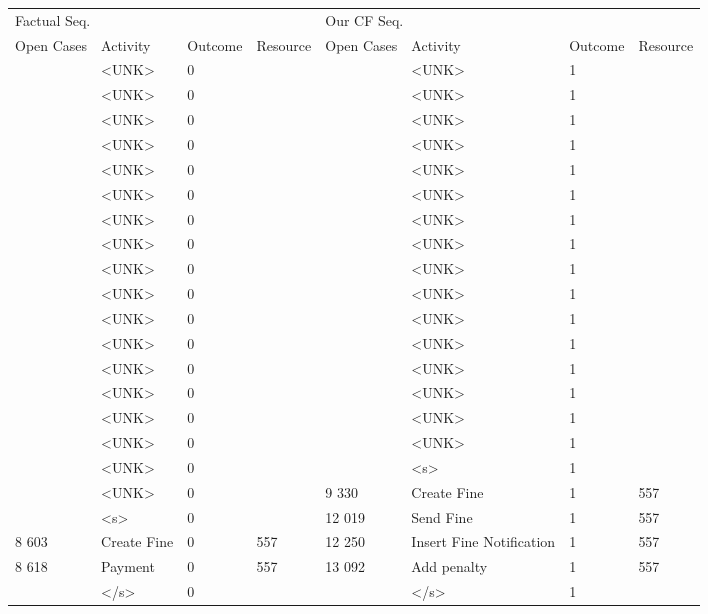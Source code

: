 \begin{tabular}{llllllll}
\toprule
\multicolumn{4}{l}{Factual Seq.} & \multicolumn{4}{l}{Our CF Seq.} \\
Open Cases & Activity & Outcome & Resource & Open Cases & Activity & Outcome & Resource \\
\midrule
 & <UNK> & 0 &  &  & <UNK> & 1 &  \\
 & <UNK> & 0 &  &  & <UNK> & 1 &  \\
 & <UNK> & 0 &  &  & <UNK> & 1 &  \\
 & <UNK> & 0 &  &  & <UNK> & 1 &  \\
 & <UNK> & 0 &  &  & <UNK> & 1 &  \\
 & <UNK> & 0 &  &  & <UNK> & 1 &  \\
 & <UNK> & 0 &  &  & <UNK> & 1 &  \\
 & <UNK> & 0 &  &  & <UNK> & 1 &  \\
 & <UNK> & 0 &  &  & <UNK> & 1 &  \\
 & <UNK> & 0 &  &  & <UNK> & 1 &  \\
 & <UNK> & 0 &  &  & <UNK> & 1 &  \\
 & <UNK> & 0 &  &  & <UNK> & 1 &  \\
 & <UNK> & 0 &  &  & <UNK> & 1 &  \\
 & <UNK> & 0 &  &  & <UNK> & 1 &  \\
 & <UNK> & 0 &  &  & <UNK> & 1 &  \\
 & <UNK> & 0 &  &  & <UNK> & 1 &  \\
 & <UNK> & 0 &  &  & <s> & 1 &  \\
 & <UNK> & 0 &  & 9 330 & Create Fine & 1 & 557 \\
 & <s> & 0 &  & 12 019 & Send Fine & 1 & 557 \\
8 603 & Create Fine & 0 & 557 & 12 250 & Insert Fine Notification & 1 & 557 \\
8 618 & Payment & 0 & 557 & 13 092 & Add penalty & 1 & 557 \\
 & </s> & 0 &  &  & </s> & 1 &  \\
\bottomrule
\end{tabular}
